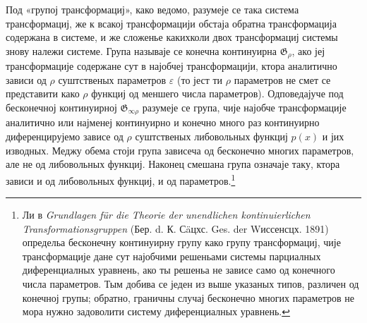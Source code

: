 ﻿\documentclass[11pt]{article}
\providecommand{\G}{\mathfrak G}
\providecommand{\eps}{\varepsilon}
\begin{document}
Под «групој трансформациј», како ведомо, разумеје се така система трансформациј, же к всакој трансформацији обстаја обратна трансформација содержана в системе, и же сложенье какихколи двох трансформациј системы знову належи системе. Група называје се конечна континуирна \(\G_\rho\), ако јеј трансформације содержане сут в најобчеј трансформацији, ктора аналитично зависи од \(\rho\) суштственых параметров \(\eps\) (то јест ти \(\rho\) параметров не смет се представити како \(\rho\) функциј од меншего числа параметров). Одповедајуче под бесконечној континуирној \(\G_{\infty\rho}\) разумеје се група, чије најобче трансформације аналитично или најменеј континуирно и конечно много раз континуирно диференцирујемо зависе од \(\rho\) суштственых либовольных функциј \(p(x)\) и јих изводных. Меджу обема стоји група зависеча од бесконечно многих параметров, але не од либовольных функциј. Наконец смешана група означаје таку, ктора зависи и од либовольных функциј, и од параметров.\footnote{Ли в \emph{Grundlagen für die Theorie der unendlichen kontinuierlichen Transformationsgruppen} (Бер. d. К. Сäцхс. Ges. der Wиссенсцх. 1891) определьа бесконечну континуирну групу како групу трансформациј, чије трансформације дане сут најобчими решеньами системы парциалных диференциалных уравнень, ако ты решеньа не зависе само од конечного числа параметров. Тым добива се једен из выше указаных типов, различен од конечној групы; обратно, граничны случај бесконечно многих параметров не мора нужно задоволити систему диференциалных уравнень.}
\end{document}
